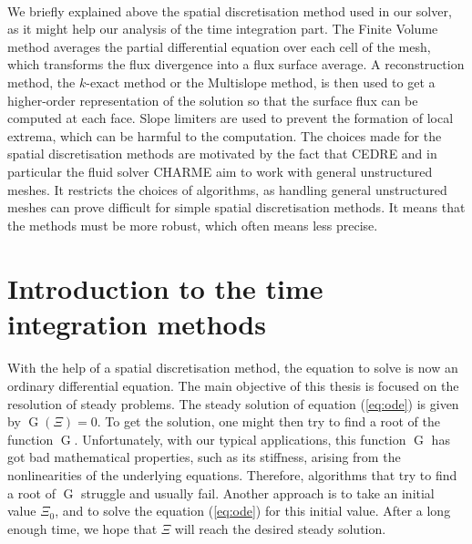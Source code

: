       \paragraph{}
      We briefly explained above the spatial discretisation method used in our solver, as it might help our analysis of the time integration part.
      The Finite Volume method averages the partial differential equation over each cell of the mesh, which transforms the flux divergence into a flux surface average.
      A reconstruction method, the $k$-exact method or the Multislope method, is then used to get a higher-order representation of the solution so that the surface flux can be computed at each face.
      Slope limiters are used to prevent the formation of local extrema, which can be harmful to the computation.
      The choices made for the spatial discretisation methods are motivated by the fact that CEDRE and in particular the fluid solver CHARME aim to work with general unstructured meshes.
      It restricts the choices of algorithms, as handling general unstructured meshes can prove difficult for simple spatial discretisation methods.
      It means that the methods must be more robust, which often means less precise.


  \section{Introduction to the time integration methods}

    \paragraph{}
    With the help of a spatial discretisation method, the equation to solve is now an ordinary differential equation.
    The main objective of this thesis is focused on the resolution of steady problems.
    The steady solution of equation (\ref{eq:ode}) is given by $\operatorname{G}\left(\Xi\right) = 0$.
    To get the solution, one might then try to find a root of the function $\operatorname{G}$.
    Unfortunately, with our typical applications, this function $\operatorname{G}$ has got bad mathematical properties, such as its stiffness, arising from the nonlinearities of the underlying equations.
    Therefore, algorithms that try to find a root of $\operatorname{G}$ struggle and usually fail.
    Another approach is to take an initial value $\Xi_0$, and to solve the equation (\ref{eq:ode}) for this initial value.
    After a long enough time, we hope that $\Xi$ will reach the desired steady solution.


